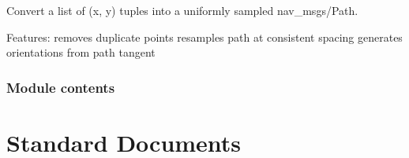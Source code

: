 \documentclass[letterpaper,10pt,english]{sphinxmanual}
\begin{document}

\begin{fulllineitems}
\label{\detokenize{mirte_lc_nav2.utils:mirte_lc_nav2.utils.log}}
\pysigstartsignatures
\pysiglinewithargsret
{}
{\sphinxparamcomma {}\sphinxparamcomma {}}
{}
\pysigstopsignatures
\end{fulllineitems}


\begin{fulllineitems}
\label{\detokenize{mirte_lc_nav2.utils:mirte_lc_nav2.utils.to_ros_path}}
\pysigstartsignatures
\pysiglinewithargsret
{}
{\sphinxparamcomma {}\sphinxparamcomma {}}
{}
\pysigstopsignatures
\sphinxAtStartPar
Convert a list of (x, y) tuples into a uniformly sampled nav\_msgs/Path.

\sphinxAtStartPar
Features:
\sphinxhyphen{} removes duplicate points
\sphinxhyphen{} resamples path at consistent spacing
\sphinxhyphen{} generates orientations from path tangent

\end{fulllineitems}



\subsection{Module contents}
\label{\detokenize{mirte_lc_nav2:module-mirte_lc_nav2}}\label{\detokenize{mirte_lc_nav2:module-contents}}
\sphinxstepscope


\chapter{Standard Documents}
\label{\detokenize{__standards:standard-documents}}\label{\detokenize{__standards::doc}}
\sphinxstepscope
\end{document}
